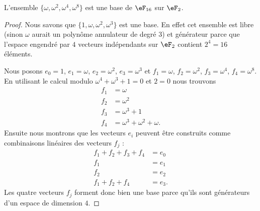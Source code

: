 \begin{proposition}
	L'ensemble \( \{ \omega,\omega^2,\omega^4,\omega^8 \}\) est une base de \( \eF_{16}\) sur \( \eF_2\).
\end{proposition}

\begin{proof}
	Nous savons que \( \{ 1,\omega,\omega^2,\omega^3 \}\) est une base. En effet cet ensemble est libre (sinon \( \omega\) aurait un polynôme annulateur de degré \( 3\)) et générateur parce que l'espace engendré par \( 4\) vecteurs indépendants sur \( \eF_2\) contient \( 2^4=16\) éléments.

	Nous posons \( e_0=1\), \( e_1=\omega\), \( e_2=\omega^2\), \( e_3=\omega^3\) et \( f_1=\omega\), \( f_2=\omega^2\), \( f_3=\omega^4\), \( f_4=\omega^8\). En utilisant le calcul modulo \( \omega^4+\omega^3+1=0\) et \( 2=0\) nous trouvons
	\begin{subequations}
		\begin{align}
			f_1 & =\omega                    \\
			f_2 & =\omega^2                  \\
			f_3 & =\omega^3+1                \\
			f_4 & =\omega^3+\omega^2+\omega.
		\end{align}
	\end{subequations}
	Ensuite nous montrons que les vecteurs \( e_i\) peuvent être construits comme combinaisons linéaires des vecteurs \( f_j\) :
	\begin{subequations}
		\begin{align}
			f_1+f_2+f_3+f_4 & =e_0  \\
			f_1             & =e_1  \\
			f_2             & =e_2  \\
			f_1+f_2+f_4     & =e_3.
		\end{align}
	\end{subequations}
	Les quatre vecteurs \( f_j\) forment donc bien une base parce qu'ils sont générateurs d'un espace de dimension \( 4\).
\end{proof}

